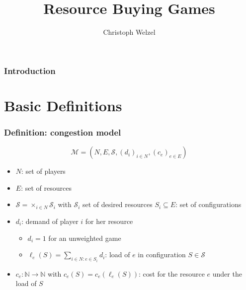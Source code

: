 \documentclass{beamer}
\title{Resource Buying Games}
\author[C. Welzel]{Christoph Welzel}
\newcommand{\tupel}[1]{\left(#1\right)}
\begin{document}

\maketitle

\begin{frame}
  \frametitle{Introduction}
\end{frame}

\section{Basic Definitions}
\begin{frame}
  \frametitle{Definition: congestion model}
  \begin{equation*}
    \mathcal{M} = \tupel{N, E, \mathcal{S}, \left(d_{i}\right)_{i\in N},
    \left(c_{e}\right)_{e\in E}}
  \end{equation*}
  \vspace{-1cm}
  \begin{itemize}
    \item $N$: set of players
    \item $E$: set of resources
    \item $\mathcal{S} = \times_{i\in N}\mathcal{S}_{i}$ with $\mathcal{S}_{i}$
      set of desired resources $S_{i}\subseteq E$: set of configurations
    \item $d_{i}$: demand of player $i$ for her resource
      \begin{itemize}
        \item $d_{i} = 1$ for an unweighted game
        \item $\ell_{e}(S) = \sum_{i\in N:e\in S_{i}}d_{i}$: load of $e$
          in configuration $S\in\mathcal{S}$
      \end{itemize}
    \item $c_{e}:\mathbb{N}\rightarrow\mathbb{N}$ with
      $c_{e}(S) = c_{e}(\ell_{e}(S))$: cost for the resource $e$ under the load
      of $S$
  \end{itemize}
\end{frame}
\end{document}
